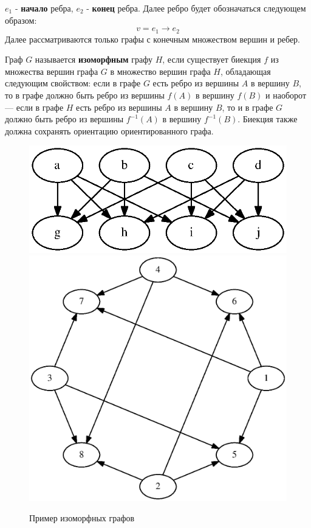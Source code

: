 \documentclass[russian,utf8,emptystyle]{eskdtext}
\begin{document}
$e_1$ - \textbf{начало} ребра, $e_2$ - \textbf{конец} ребра. Далее ребро будет обозначаться следующем образом:
$$
v = e_1 \rightarrow e_2
$$
Далее рассматриваются только графы с конечным множеством вершин и ребер.

Граф $G$ называется \textbf{изоморфным} графу $H$, если существует биекция $f$ из множества вершин графа $G$ в множество вершин графа $H$, обладающая следующим свойством: если в графе $G$ есть ребро из вершины $A$ в вершину $B$, то в графе должно быть ребро из вершины $f(A)$ в вершину $f(B)$ и наоборот --- если в графе $H$ есть ребро из вершины $A$ в вершину $B$, то и в графе $G$ должно быть ребро из вершины $f^{-1}(A)$ в вершину $f^{-1}(B)$. Биекция также должна сохранять ориентацию ориентированного графа.

\begin{figure}[h!]
\centering
\includegraphics[scale=0.6]{graphs_isomorph_example_1}
\includegraphics[scale=0.6]{graphs_isomorph_example_2}
\caption{Пример изоморфных графов}
\label{fig:graphs_isomorph_example}
\end{figure}
\end{document}
